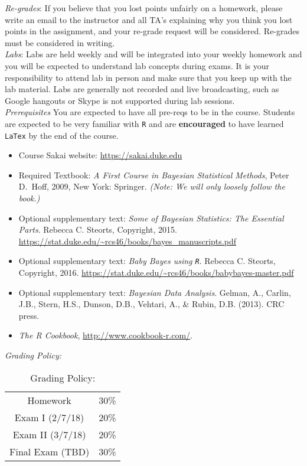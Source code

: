 \documentclass[11pt]{article}
\begin{document}
\emph{Re-grades}: If you believe that you lost points unfairly on a homework, please write an email to the instructor and all TA's explaining why you think you lost points in the assignment, and your re-grade request will be considered. Re-grades must be considered in writing. \\

\emph{Labs}: Labs are held weekly and will be integrated into your weekly homework and you will be expected to understand lab concepts during exams. It is your responsibility to attend lab in person and make sure that you keep up with the lab material. Labs are generally not recorded and live broadcasting, such as Google hangouts or Skype is not supported during lab sessions. \\

\emph{Prerequisites} You are expected to have all pre-reqs to be in the course. Students are expected to be very familiar with \texttt{R} and are \textbf{encouraged} to have learned \texttt{LaTex} by the end of the course. 

\begin{itemize}
\item[] Course Sakai website: \url{https://sakai.duke.edu}
\item[] Required Textbook: \textit{A First Course in Bayesian Statistical Methods}, Peter D.\ Hoff, 2009, New York: Springer. \textit{(Note: We will only loosely follow the book.)}
\item[] Optional supplementary text:  \textit{Some of Bayesian Statistics: The Essential Parts}. Rebecca C. Steorts, Copyright, 2015. \url{https://stat.duke.edu/~rcs46/books/bayes_manuscripts.pdf}
\item[] Optional supplementary text:  \textit{Baby Bayes using \texttt{R}}. Rebecca C. Steorts, Copyright, 2016. 
\url{https://stat.duke.edu/~rcs46/books/babybayes-master.pdf}
\item[] Optional supplementary text:  \textit{Bayesian Data Analysis}. Gelman, A., Carlin, J.B., Stern, H.S., Dunson, D.B., Vehtari, A., \& Rubin, D.B. (2013). CRC press.
\item[] \emph{The R Cookbook}, \url{http://www.cookbook-r.com/}.
\end{itemize}

\emph{Grading Policy:} 

\begin{table}[ht]
\caption{Grading Policy:}
\begin{center}
\begin{tabular}{cc}
Homework &30\%\\
Exam I (2/7/18) &20\%\\
Exam  II (3/7/18) & 20\%\\
Final Exam  (TBD) & 30\%\\
\end{tabular}
\end{center}
\label{default}
\end{table}%
\end{document}
